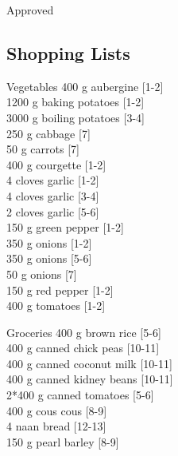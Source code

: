 \begin{menu}{Approved}
    \subsection*{Shopping Lists}
      \begin{shoppinglist}{Vegetables}
      400 g aubergine 
        {\scriptsize[1-2]}\\
      1200 g baking potatoes 
        {\scriptsize[1-2]}\\
      3000 g boiling potatoes 
        {\scriptsize[3-4]}\\
      250 g cabbage 
        {\scriptsize[7]}\\
      50 g carrots 
        {\scriptsize[7]}\\
      400 g courgette 
        {\scriptsize[1-2]}\\
      4 cloves garlic 
        {\scriptsize[1-2]}\\
      4 cloves garlic 
        {\scriptsize[3-4]}\\
      2 cloves garlic 
        {\scriptsize[5-6]}\\
      150 g green pepper 
        {\scriptsize[1-2]}\\
      350 g onions 
        {\scriptsize[1-2]}\\
      350 g onions 
        {\scriptsize[5-6]}\\
      50 g onions 
        {\scriptsize[7]}\\
      150 g red pepper 
        {\scriptsize[1-2]}\\
      400 g tomatoes 
        {\scriptsize[1-2]}\\
      \end{shoppinglist}%
      \begin{shoppinglist}{Groceries}
      400 g brown rice 
        {\scriptsize[5-6]}\\
      400 g canned chick peas 
        {\scriptsize[10-11]}\\
      400 g canned coconut milk 
        {\scriptsize[10-11]}\\
      400 g canned kidney beans 
        {\scriptsize[10-11]}\\
      2*400 g canned tomatoes 
        {\scriptsize[5-6]}\\
      400 g cous cous 
        {\scriptsize[8-9]}\\
      4  naan bread 
        {\scriptsize[12-13]}\\
      150 g pearl barley 
        {\scriptsize[8-9]}\\

\end{shoppinglist}
\end{menu}
